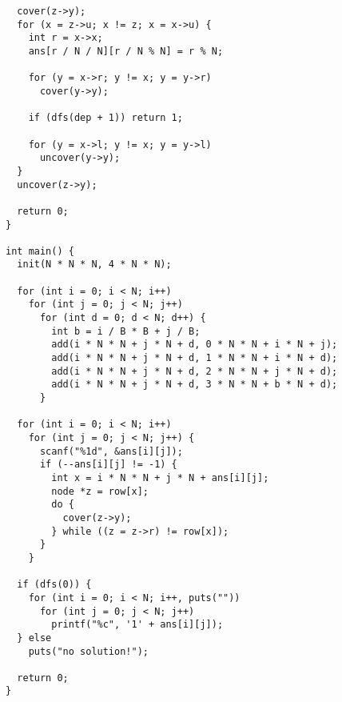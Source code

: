 \begin{verbatim}
  cover(z->y);
  for (x = z->u; x != z; x = x->u) {
    int r = x->x;
    ans[r / N / N][r / N % N] = r % N;

    for (y = x->r; y != x; y = y->r)
      cover(y->y);

    if (dfs(dep + 1)) return 1;

    for (y = x->l; y != x; y = y->l)
      uncover(y->y);
  }
  uncover(z->y);

  return 0;
}

int main() {
  init(N * N * N, 4 * N * N);

  for (int i = 0; i < N; i++)
    for (int j = 0; j < N; j++)
      for (int d = 0; d < N; d++) {
        int b = i / B * B + j / B;
        add(i * N * N + j * N + d, 0 * N * N + i * N + j);
        add(i * N * N + j * N + d, 1 * N * N + i * N + d);
        add(i * N * N + j * N + d, 2 * N * N + j * N + d);
        add(i * N * N + j * N + d, 3 * N * N + b * N + d);
      }

  for (int i = 0; i < N; i++)
    for (int j = 0; j < N; j++) {
      scanf("%1d", &ans[i][j]);
      if (--ans[i][j] != -1) {
        int x = i * N * N + j * N + ans[i][j];
        node *z = row[x];
        do {
          cover(z->y);
        } while ((z = z->r) != row[x]);
      }
    }

  if (dfs(0)) {
    for (int i = 0; i < N; i++, puts(""))
      for (int j = 0; j < N; j++)
        printf("%c", '1' + ans[i][j]);
  } else
    puts("no solution!");

  return 0;
}
\end{verbatim}
